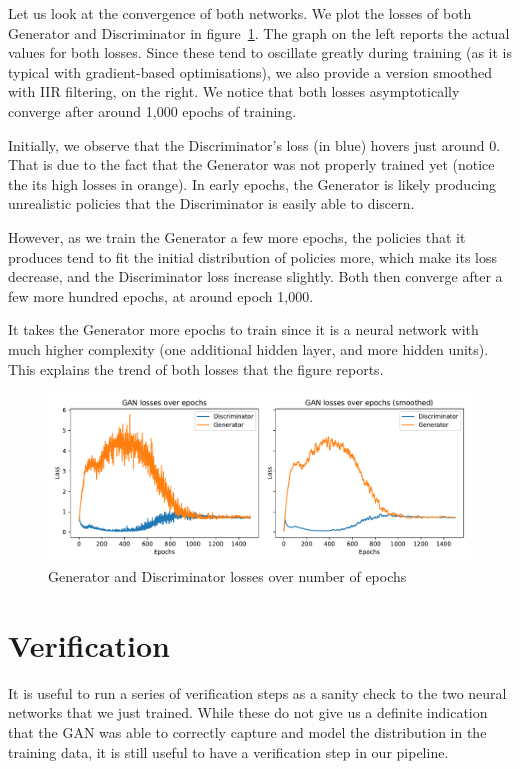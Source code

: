Let us look at the convergence of both networks. We plot the losses of both Generator and Discriminator in figure~\ref{fig:GANLosses}. The graph on the left reports the actual values for both losses. Since these tend to oscillate greatly during training (as it is typical with gradient-based optimisations), we also provide a version smoothed with IIR filtering, on the right. We notice that both losses asymptotically converge after around 1,000 epochs of training.

Initially, we observe that the Discriminator's loss (in blue) hovers just around 0. That is due to the fact that the Generator was not properly trained yet (notice the its high losses in orange). In early epochs, the Generator is likely producing unrealistic policies that the Discriminator is easily able to discern.

However, as we train the Generator a few more epochs, the policies that it produces tend to fit the initial distribution of policies more, which make its loss decrease, and the Discriminator loss increase slightly. Both then converge after a few more hundred epochs, at around epoch 1,000.

It takes the Generator more epochs to train since it is a neural network with much higher complexity (one additional hidden layer, and more hidden units). This explains the trend of both losses that the figure reports.

\begin{figure}
\centering
\includegraphics[width=15cm]{Figures/GAN_losses}
\caption{Generator and Discriminator losses over number of epochs}
\label{fig:GANLosses}
\end{figure}



\section{Verification}
It is useful to run a series of verification steps as a sanity check to the two neural networks that we just trained. While these do not give us a definite indication that the GAN was able to correctly capture and model the distribution in the training data, it is still useful to have a verification step in our pipeline.

